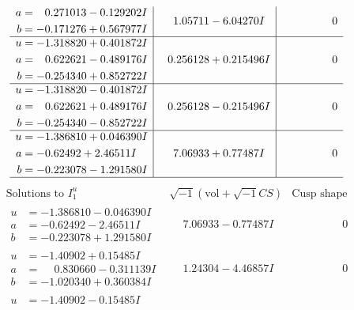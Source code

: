 \documentclass[1p]{elsarticle_modified}
\theoremstyle{definition}
\newcommand{\I}{\sqrt{-1}}
\begin{document}
$$\begin{array}{c|c|c}
\begin{aligned}
a &= \phantom{-}0.271013 - 0.129202 I \\
b &= -0.171276 + 0.567977 I\end{aligned}
 & \phantom{-}1.05711 - 6.04270 I & \phantom{-0.000000 } 0 \\ \hline\begin{aligned}
u &= -1.318820 + 0.401872 I \\
a &= \phantom{-}0.622621 - 0.489176 I \\
b &= -0.254340 + 0.852722 I\end{aligned}
 & \phantom{-}0.256128 + 0.215496 I & \phantom{-0.000000 } 0 \\ \hline\begin{aligned}
u &= -1.318820 - 0.401872 I \\
a &= \phantom{-}0.622621 + 0.489176 I \\
b &= -0.254340 - 0.852722 I\end{aligned}
 & \phantom{-}0.256128 - 0.215496 I & \phantom{-0.000000 } 0 \\ \hline\begin{aligned}
u &= -1.386810 + 0.046390 I \\
a &= -0.62492 + 2.46511 I \\
b &= -0.223078 - 1.291580 I\end{aligned}
 & \phantom{-}7.06933 + 0.77487 I & \phantom{-0.000000 } 0\\
 \hline 
 \end{array}$$\newpage$$\begin{array}{c|c|c}  
\text{Solutions to }I^u_{1}& \I (\text{vol} + \sqrt{-1}CS) & \text{Cusp shape}\\
 \hline 
\begin{aligned}
u &= -1.386810 - 0.046390 I \\
a &= -0.62492 - 2.46511 I \\
b &= -0.223078 + 1.291580 I\end{aligned}
 & \phantom{-}7.06933 - 0.77487 I & \phantom{-0.000000 } 0 \\ \hline\begin{aligned}
u &= -1.40902 + 0.15485 I \\
a &= \phantom{-}0.830660 - 0.311139 I \\
b &= -1.020340 + 0.360384 I\end{aligned}
 & \phantom{-}1.24304 - 4.46857 I & \phantom{-0.000000 } 0 \\ \hline\begin{aligned}
u &= -1.40902 - 0.15485 I \\

\end{aligned}
\end{array}$$
\end{document}
